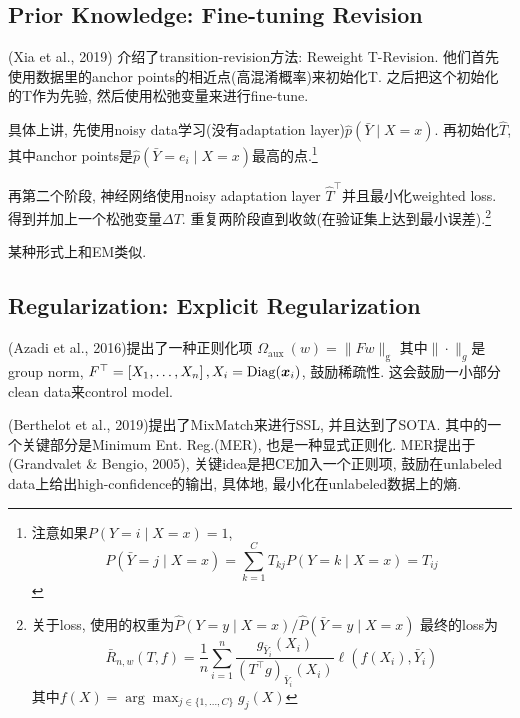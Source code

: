 \documentclass{article}
\begin{document}
\subsection{Prior Knowledge: Fine-tuning Revision}

(Xia et al., 2019) 介绍了transition-revision方法: Reweight T-Revision. 他们首先使用数据里的anchor points的相近点(高混淆概率)来初始化T. 之后把这个初始化的T作为先验, 然后使用松弛变量来进行fine-tune.

具体上讲, 先使用noisy data学习(没有adaptation layer)$\hat{p}(\bar Y \mid X=x)$. 再初始化$\hat T$, 其中anchor points是$\hat{p}\left(\bar{Y}=e_{i} \mid X=x\right)$最高的点.\footnote{
    注意如果$P(Y=i \mid X=x)=1$,
    \begin{equation}
        P(\bar{Y}=j \mid X=x)=\sum_{k=1}^{C} T_{k j} P(Y=k \mid X=x)=T_{i j}
    \end{equation}
}

再第二个阶段, 神经网络使用noisy adaptation layer $\hat{T}^{\top}$并且最小化weighted loss. 得到并加上一个松弛变量$\Delta T$. 重复两阶段直到收敛(在验证集上达到最小误差).\footnote{
    关于loss, 使用的权重为$\hat{P}(Y=y \mid X=x) / \hat{P}(\bar{Y}=y \mid X=x)$
    最终的loss为
    \begin{equation}
        \bar{R}_{n, w}(T, f)=\frac{1}{n} \sum_{i=1}^{n} \frac{g_{\bar{Y}_{i}}\left(X_{i}\right)}{\left(T^{\top} g\right)_{\bar{Y}_{i}}\left(X_{i}\right)} \ell\left(f\left(X_{i}\right), \bar{Y}_{i}\right)
    \end{equation}
    其中$f(X)=\arg \max _{j \in\{1, \ldots, C\}} g_{j}(X)$
}

\begin{remark}
    某种形式上和EM类似.
\end{remark}

\subsection{Regularization: Explicit Regularization}

(Azadi et al., 2016)提出了一种正则化项
$\Omega_{\text {aux }}(w)=\|F w\|_{\mathrm{g}}$
其中$\|\cdot\|_{g}$是group norm,
$F^{\top}=\left[X_{1}, \ldots, X_{n}\right], X_i=\operatorname{Diag}(\boldsymbol{x}_i)$,
鼓励稀疏性. 这会鼓励一小部分clean data来control model.

(Berthelot et al., 2019)提出了MixMatch来进行SSL, 并且达到了SOTA. 其中的一个关键部分是Minimum Ent. Reg.(MER), 也是一种显式正则化. MER提出于(Grandvalet \&  Bengio, 2005), 关键idea是把CE加入一个正则项, 鼓励在unlabeled data上给出high-confidence的输出, 具体地, 最小化在unlabeled数据上的熵.
\end{document}
